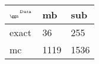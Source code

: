 \begin{tabular}{lll}
    \toprule
    $_{\text{\tiny{\ggn}}}$$^{\text{\tiny{Data}}}$ & mb & sub \\
    \midrule
    exact & 36
              & 255 \\
    mc   & 1119
              & 1536 \\
    \bottomrule
\end{tabular}
